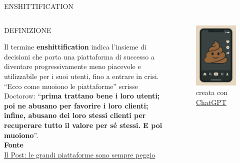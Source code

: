\documentclass[aspectratio=1610]{beamer}
\begin{document}
\begin{frame}{ENSHITTIFICATION}
    \begin{columns}
            \begin{alertblock}{DEFINIZIONE}
                \begin{minipage}{0.96\linewidth}
                    \justifying
                    Il termine \textbf{enshittification} indica l’insieme di decisioni che porta 
                    una piattaforma di successo a diventare progressivamente meno piacevole e 
                    utilizzabile per i suoi utenti, fino a entrare in crisi. ``Ecco come muoiono 
                    le piattaforme'' scrisse Doctorow: ``\textbf{prima trattano bene i loro utenti; poi ne 
                    abusano per favorire i loro clienti; infine, abusano dei loro stessi clienti 
                    per recuperare tutto il valore per sé stessi. E poi muoiono}''.\\
                    \bigskip
                    \tiny{\textbf{Fonte}}\\
                    \tiny{\href{https://www.ilpost.it/2023/08/03/enshittification/}{Il Post: le grandi piattaforme sono sempre peggio}}
                \end{minipage}
            \end{alertblock}
            \begin{figure}
                \includegraphics[width=.7\linewidth]{img/shit.png}
                \caption{{creata con \href{https://chatgpt.com}{ChatGPT}}}
            \end{figure}
    \end{columns}
\end{frame}
\end{document}
